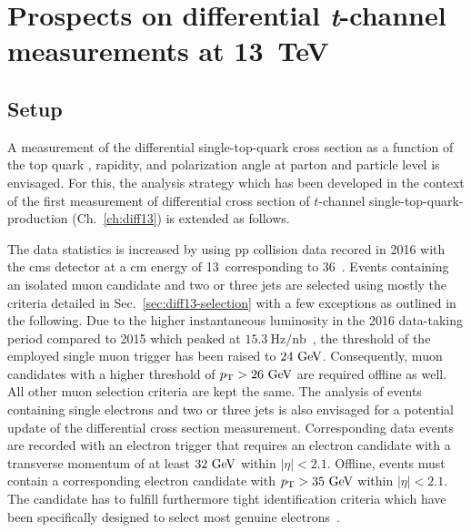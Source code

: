 \chapter{Prospects on differential \textsl{t}-channel measurements at 13~TeV}
\label{ch:prospects}



\section{Setup}

A measurement of the differential single-top-quark cross section as a function of the top quark \pt, rapidity, and polarization angle at parton and particle level is envisaged. For this, the analysis strategy which has been developed in the context of the first measurement of differential cross section of $t$-channel single-top-quark-production (Ch.~\ref{ch:diff13}) is extended as follows.

The data statistics is increased by using \gls{pp} collision data recored in 2016 with the \gls{cms} detector at a \acrlong{cm} energy of 13~\TeV corresponding to 36~\invfb. Events containing an isolated muon candidate and two or three jets are selected using mostly the criteria detailed in Sec.~\ref{sec:diff13-selection} with a few exceptions as outlined in the following. Due to the higher instantaneous luminosity in the 2016 data-taking period compared to 2015 which peaked at $15.3~\mathrm{Hz}/\mathrm{nb}$~\cite{lumipublic}, the threshold of the employed single muon trigger has been raised to $24~\textrm{GeV}$. Consequently, muon candidates with a higher threshold of $p_\textrm{T}>26~\textrm{GeV}$ are required offline as well. All other muon selection criteria are kept the same. The analysis of events containing single electrons and two or three jets is also envisaged for a potential update of the differential cross section measurement. Corresponding data events are recorded with an electron trigger that requires an electron candidate with a transverse momentum of at least $32~\textrm{GeV}$ within $|\eta|<2.1$. Offline, events must contain a corresponding electron candidate with $p_\textrm{T}>35~\textrm{GeV}$ within $|\eta|<2.1$. The candidate has to fulfill furthermore tight identification criteria which have been specifically designed to select most genuine electrons~\cite{CMS-DP-2017-004}.

